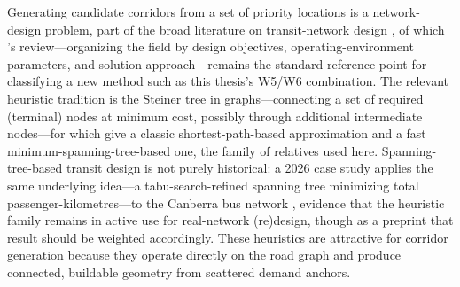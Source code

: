 Generating candidate corridors from a set of priority locations is a network-design
problem, part of the broad literature on transit-network design
\parencite{guihaire2008, farahani2013review}, of which \textcite{kepaptsoglou2009review}'s
review---organizing the field by design objectives, operating-environment parameters, and
solution approach---remains the standard reference point for classifying a new method such
as this thesis's W5/W6 combination. The relevant heuristic tradition is the
Steiner tree in graphs---connecting a set of required (terminal) nodes at minimum cost,
possibly through additional intermediate nodes---for which \textcite{takahashi1980} give
a classic shortest-path-based approximation and \textcite{kmb1981steiner} a fast
minimum-spanning-tree-based one, the family of relatives used here. Spanning-tree-based
transit design is not purely historical: a 2026 case study applies the same underlying
idea---a tabu-search-refined spanning tree minimizing total passenger-kilometres---to the
Canberra bus network \parencite{suguira2026spanningtree}, evidence that the heuristic
family remains in active use for real-network (re)design, though as a preprint that
result should be weighted accordingly. These heuristics are attractive for corridor
generation because they operate directly on the road graph and produce connected,
buildable geometry from scattered demand anchors.

